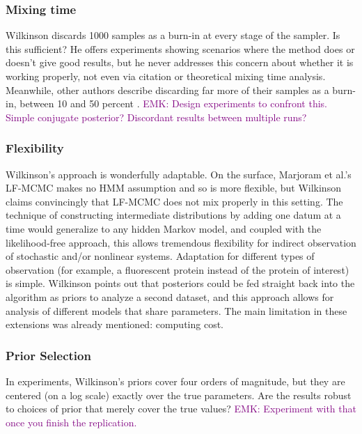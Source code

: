 \documentclass{article}
\newcommand\EMK[1]{\textcolor{purple}{EMK: #1}}
\begin{document}
\subsubsection{Mixing time}
Wilkinson discards 1000 samples as a burn-in at every stage of the sampler. Is this sufficient? He offers experiments showing scenarios where the method does or doesn't give good results, but he never addresses this concern about whether it is working properly, not even via citation or theoretical mixing time analysis. Meanwhile, other authors describe discarding far more of their samples as a burn-in, between 10 and 50 percent \cite{gupta2014comparison,zechner2014scalable}.  \EMK{Design experiments to confront this. Simple conjugate posterior? Discordant results between multiple runs?}


\subsubsection{Flexibility}
Wilkinson's approach is wonderfully adaptable. On the surface, Marjoram et al.'s LF-MCMC makes no HMM assumption and so is more flexible, but Wilkinson claims convincingly that LF-MCMC does not mix properly in this setting. The technique of constructing intermediate distributions by adding one datum at a time would generalize to any hidden Markov model, and coupled with the likelihood-free approach, this allows tremendous flexibility for indirect observation of stochastic and/or nonlinear systems. Adaptation for different types of observation (for example, a fluorescent protein instead of the protein of interest) is simple. Wilkinson points out that posteriors could be fed straight back into the algorithm as priors to analyze a second dataset, and this approach allows for analysis of different models that share parameters. The main limitation in these extensions was already mentioned: computing cost.

\subsubsection{Prior Selection}
In experiments, Wilkinson's priors cover four orders of magnitude, but they are centered (on a log scale) exactly over the true parameters. Are the results robust to choices of prior that merely cover the true values? \EMK{Experiment with that once you finish the replication.}
\end{document}
